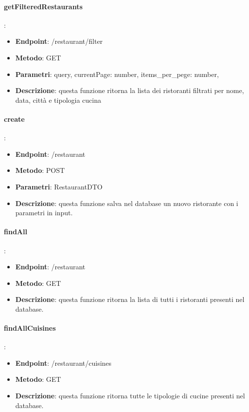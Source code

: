 \paragraph{getFilteredRestaurants}:
\begin{itemize}
    \item \textbf{Endpoint}: /restaurant/filter
    \item \textbf{Metodo}: GET
    \item \textbf{Parametri}: query, currentPage: number, items\_per\_pege: number,
    \item \textbf{Descrizione}: questa funzione ritorna la lista dei ristoranti filtrati per nome, data, città e tipologia cucina
\end{itemize}
\paragraph{create}:
\begin{itemize}
    \item \textbf{Endpoint}: /restaurant
    \item \textbf{Metodo}: POST
    \item \textbf{Parametri}: RestaurantDTO
    \item \textbf{Descrizione}: questa funzione salva nel database un nuovo ristorante con i parametri in input.
\end{itemize}
\paragraph{findAll}:
\begin{itemize}
    \item \textbf{Endpoint}: /restaurant
    \item \textbf{Metodo}: GET
    \item \textbf{Descrizione}: questa funzione ritorna la lista di tutti i ristoranti presenti nel database.
\end{itemize}
\paragraph{findAllCuisines}:
\begin{itemize}
    \item \textbf{Endpoint}: /restaurant/cuisines
    \item \textbf{Metodo}: GET
    \item \textbf{Descrizione}: questa funzione ritorna tutte le tipologie di cucine presenti nel database.
\end{itemize}
